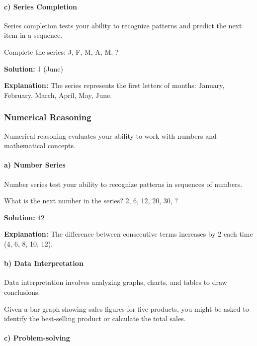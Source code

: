\paragraph{c) Series Completion}

Series completion tests your ability to recognize patterns and predict
the next item in a sequence.

\begin{example}
Complete the series: J, F, M, A, M, ?

\textbf{Solution:} J (June)

\textbf{Explanation:} The series represents the first letters of months: January, February, March, April, May, June.
\end{example}

\subsubsection{Numerical Reasoning}

Numerical reasoning evaluates your ability to work with numbers and
mathematical concepts.

\paragraph{a) Number Series}

Number series test your ability to recognize patterns in sequences of
numbers.

\begin{example}
What is the next number in the series? 2, 6, 12, 20, 30, ?

\textbf{Solution:} 42

\textbf{Explanation:} The difference between consecutive terms increases by 2 each time (4, 6, 8, 10, 12).
\end{example}

\paragraph{b) Data Interpretation}

Data interpretation involves analyzing graphs, charts, and tables to
draw conclusions.

\begin{example}
Given a bar graph showing sales figures for five products, you might be asked to identify the best-selling product or calculate the total sales.
\end{example}

\paragraph{c) Problem-solving}

